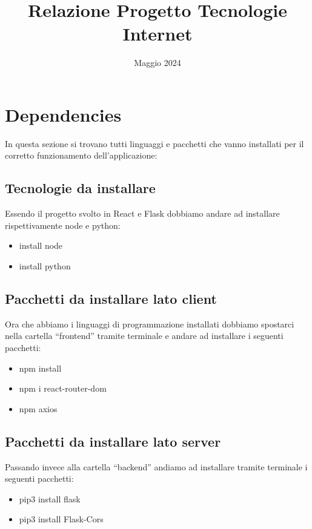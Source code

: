 \documentclass{article}
\title{Relazione Progetto Tecnologie Internet}
\author{ }
\date{Maggio 2024}
\begin{document}
\maketitle
\tableofcontents



\section{Dependencies}
In questa sezione si trovano tutti linguaggi e pacchetti che vanno installati per il corretto funzionamento dell’applicazione:

\subsection{Tecnologie da installare}
Essendo il progetto svolto in React e Flask dobbiamo andare ad installare rispettivamente node e python:
\begin{itemize}
    \item install node
    \item install python
\end{itemize}

\subsection{Pacchetti da installare lato client}
Ora che abbiamo i linguaggi di programmazione installati dobbiamo spostarci nella cartella “frontend” tramite terminale e andare ad installare i seguenti pacchetti:
\begin{itemize}
    \item npm install
    \item npm i react-router-dom
    \item npm axios
\end{itemize}

\subsection{Pacchetti da installare lato server}
Passando invece alla cartella “backend” andiamo ad installare tramite terminale i seguenti pacchetti:
\begin{itemize}
    \item pip3 install flask
    \item pip3 install Flask-Cors
\end{itemize}
\end{document}
